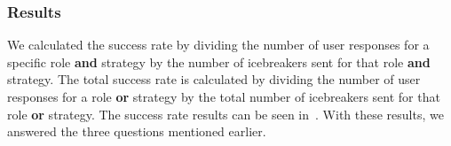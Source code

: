 
\subsubsection{Results}
\label{sec:result_interaction}
 We calculated the success rate by dividing the number of user responses for a specific role \textbf{and} strategy by the number of icebreakers sent for that role \textbf{and} strategy. The total success rate is calculated by dividing the number of user responses for a role \textbf{or} strategy by the total number of icebreakers sent for that role \textbf{or} strategy. The success rate results can be seen in~. With these results, we answered the three questions mentioned earlier.

